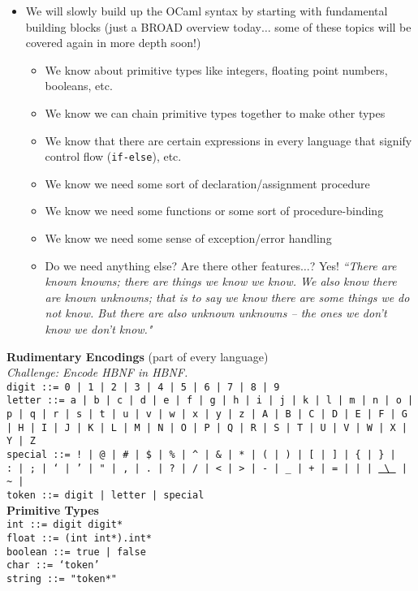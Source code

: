 \begin{itemize}
    \item We will slowly build up the \textsf{OCaml} syntax by starting with fundamental building blocks (just a BROAD overview today$\ldots$ some of these topics will be covered again in more depth soon!)
    \begin{itemize}
        \item We know about primitive types like integers, floating point numbers, booleans, etc.
        \item We know we can chain primitive types together to make other types
        \item We know that there are certain expressions in every language that signify control flow (\texttt{if-else}), etc.
        \item We know we need some sort of declaration/assignment procedure
        \item We know we need some functions or some sort of procedure-binding
        \item We know we need some sense of exception/error handling
        \item Do we need anything else? Are there other features$\ldots$? Yes! \textit{``There are known knowns; there are things we know we know. We also know there are known unknowns; that is to say we know there are some things we do not know. But there are also unknown unknowns -- the ones we don't know we don't know."}
    \end{itemize}
\end{itemize}

\pagebreak

\noindent
\textbf{Rudimentary Encodings} (part of every language) \\
\textit{Challenge: Encode HBNF in HBNF.} \\
\texttt{digit ::= 0 | 1 | 2 | 3 | 4 | 5 | 6 | 7 | 8 | 9} \\
\texttt{letter ::= a | b | c | d | e | f | g | h | i | j | k | l | m | n | o | p | q | r | s | t | u | v | w | x | y | z | A | B | C | D | E | F | G | H | I | J | K | L | M | N | O | P | Q | R | S | T | U | V | W | X | Y | Z} \\
\texttt{special ::= !\ | @ | \# | \$ | \% | \^{} | \& | * | ( | ) | [ | ] | \{ | \} | :\ | ; | ` | ' | " | , | .\ | ?\ | / | < | > | - | \_ | + | = | | | \url{ \ } | \~{} | \textvisiblespace{}} \\
\texttt{token ::= digit | letter | special} \\

\noindent
\textbf{Primitive Types} \\
\texttt{int ::= digit digit*} \\
\texttt{float ::= (int int*).int*} \\
\texttt{boolean ::= true | false} \\
\texttt{char ::= `token'} \\
\texttt{string ::= "token*"} \\

